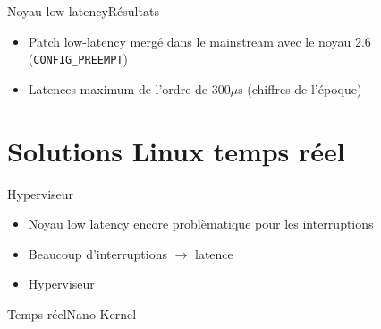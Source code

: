 \begin{frame}{Noyau low latency}{Résultats} %
  \begin{itemize}
  \item Patch low-latency  mergé dans le mainstream avec  le noyau 2.6
    (\texttt{CONFIG\_PREEMPT})
  \item Latences maximum de l'ordre de 300$\mu$s (chiffres de l'époque)
  \end{itemize}
\end{frame}

\section{Solutions Linux temps réel} %

\begin{frame}{Hyperviseur}
  \begin{itemize}
  \item Noyau low latency encore problèmatique pour les interruptions
  \item Beaucoup d'interruptions $\to$ latence
  \item Hyperviseur
  \end{itemize}
\end{frame}

\begin{frame}{Temps réel}{Nano Kernel}
  \begin{center}
  \end{center}
\end{frame}

